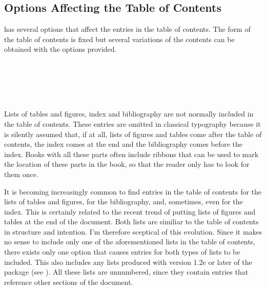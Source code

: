 \subsection{Options Affecting the Table of Contents}
\label{sec:maincls.tocOptions}

{\KOMAScript} has several options that affect the entries in the table
of contents. The form of the table
of contents is fixed but several variations of the contents can be
obtained with the options provided.

\begin{Explain}%
\begin{Declaration}
  \\
  \\
  \\
  \\
\end{Declaration}%
%
%
%
%
%
  Lists of tables and figures, index and bibliography are not normally
  included in the table of contents. These entries are omitted in
  classical typography because it is silently assumed that, if at all,
  lists of figures and tables come after the table of contents, the
  index comes at the end and the bibliography comes before the index.
  Books with all these parts often include ribbons that can be used to
  mark the location of these parts in the book, so that the reader
  only has to look for them once.
\end{Explain}

It is becoming increasingly common to find entries in the table of
contents for the lists of tables and figures, for the bibliography,
and, sometimes, even for the index. This is certainly related to the
recent trend of putting lists of figures and tables at the end of the
document. Both lists are similiar to the table of contents in
structure and intention. I'm therefore sceptical of this evolution.
Since it makes no sense to include only one of the aforementioned lists
in the table of contents, there exists only one option
 that causes entries for both types of lists to be
included. This also includes any lists produced with version 1.2e or
later of the  package (see
\cite{package:float}).  All these lists are unnumbered, since they
contain entries that reference other sections of the document.

